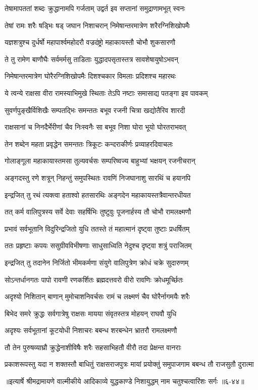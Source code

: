 \twolineshloka
{तेषामापततां शब्दः क्रुद्धानामपि गर्जताम्}
{उद्वर्त इव सप्तानां समुद्राणामभूत् स्वनः} %

\twolineshloka
{तेषां रामः शरैः षड्भिः षड् जघान निशाचरान्}
{निमेषान्तरमात्रेण शरैरग्निशिखोपमैः} %

\twolineshloka
{यज्ञशत्रुश्च दुर्धर्षो महापार्श्वमहोदरौ}
{वज्रदंष्ट्रो महाकायस्तौ चोभौ शुकसारणौ} %

\twolineshloka
{ते तु रामेण बाणौघैः सर्वमर्मसु ताडिताः}
{युद्धादपसृतास्तत्र सावशेषायुषोऽभवन्} %

\twolineshloka
{निमेषान्तरमात्रेण घोरैरग्निशिखोपमैः}
{दिशश्चकार विमलाः प्रदिशश्च महारथः} %

\twolineshloka
{ये त्वन्ये राक्षसा वीरा रामस्याभिमुखे स्थिताः}
{तेऽपि नष्टाः समासाद्य पतङ्गा इव पावकम्} %

\twolineshloka
{सुवर्णपुङ्खैर्विशिखैः सम्पतद्भिः समन्ततः}
{बभूव रजनी चित्रा खद्योतैरिव शारदी} %

\twolineshloka
{राक्षसानां च निनदैर्भेरीणां चैव निःस्वनैः}
{सा बभूव निशा घोरा भूयो घोरतराभवत्} %

\twolineshloka
{तेन शब्देन महता प्रवृद्धेन समन्ततः}
{त्रिकूटः कन्दराकीर्णः प्रव्याहरदिवाचलः} %

\twolineshloka
{गोलाङ्गूला महाकायास्तमसा तुल्यवर्चसः}
{सम्परिष्वज्य बाहुभ्यां भक्षयन् रजनीचरान्} %

\twolineshloka
{अङ्गदस्तु रणे शत्रून् निहन्तुं समुपस्थितः}
{रावणिं निजघानाशु सारथिं च हयानपि} %

\twolineshloka
{इन्द्रजित् तु रथं त्यक्त्वा हताश्वो हतसारथिः}
{अङ्गदेन महाकायस्तत्रैवान्तरधीयत} %

\twolineshloka
{तत् कर्म वालिपुत्रस्य सर्वे देवाः सहर्षिभिः}
{तुष्टुवुः पूजनार्हस्य तौ चोभौ रामलक्ष्मणौ} %

\twolineshloka
{प्रभावं सर्वभूतानि विदुरिन्द्रजितो युधि}
{ततस्ते तं महात्मानं दृष्ट्वा तुष्टाः प्रधर्षितम्} %

\twolineshloka
{ततः प्रहृष्टाः कपयः ससुग्रीवविभीषणाः}
{साधुसाध्विति नेदुश्च दृष्ट्वा शत्रुं पराजितम्} %

\twolineshloka
{इन्द्रजित् तु तदानेन निर्जितो भीमकर्मणा}
{संयुगे वालिपुत्रेण क्रोधं चक्रे सुदारुणम्} %

\twolineshloka
{सोऽन्तर्धानगतः पापो रावणी रणकर्शितः}
{ब्रह्मदत्तवरो वीरो रावणिः क्रोधमूर्च्छितः} %

\twolineshloka
{अदृश्यो निशितान् बाणान् मुमोचाशनिवर्चसः}
{रामं च लक्ष्मणं चैव घोरैर्नागमयैः शरैः} %

\twolineshloka
{बिभेद समरे क्रुद्धः सर्वगात्रेषु राक्षसः}
{मायया संवृतस्तत्र मोहयन् राघवौ युधि} %

\twolineshloka
{अदृश्यः सर्वभूतानां कूटयोधी निशाचरः}
{बबन्ध शरबन्धेन भ्रातरौ रामलक्ष्मणौ} %

\twolineshloka
{तौ तेन पुरुषव्याघ्रौ क्रुद्धेनाशीविषैः शरैः}
{सहसाभिहतौ वीरौ तदा प्रेक्षन्त वानराः} %

\twolineshloka
{प्रकाशरूपस्तु यदा न शक्तस्तौ बाधितुं राक्षसराजपुत्रः}
{मायां प्रयोक्तुं समुपाजगाम बबन्ध तौ राजसुतौ दुरात्मा} %


॥इत्यार्षे श्रीमद्रामायणे वाल्मीकीये आदिकाव्ये युद्धकाण्डे निशायुद्धम् नाम चतुश्चत्वारिंशः सर्गः ॥६-४४॥
